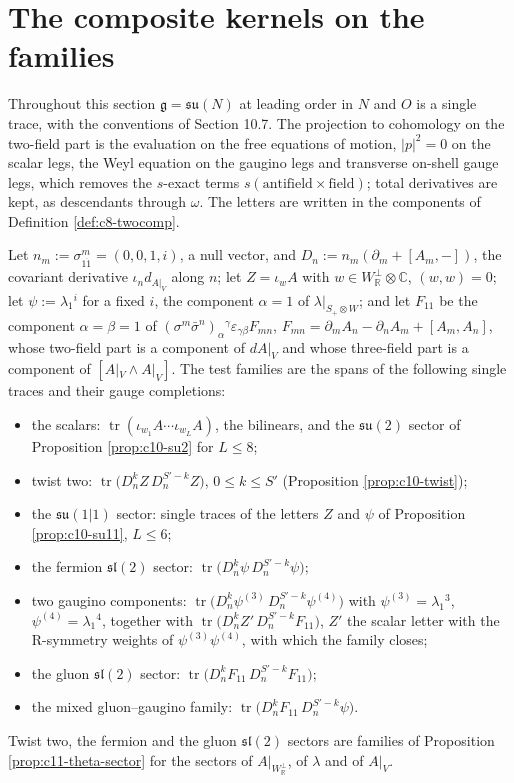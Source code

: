 \section{The composite kernels on the families}

Throughout this section $\mathfrak g=\mathfrak{su}(N)$ at leading order in $N$ and $O$ is a single trace, with the conventions of Section 10.7. The projection to cohomology on the two-field part is the evaluation on the free equations of motion, $|p|^2=0$ on the scalar legs, the Weyl equation on the gaugino legs and transverse on-shell gauge legs, which removes the $s$-exact terms $s(\text{antifield}\times\text{field})$; total derivatives are kept, as descendants through $\omega$. The letters are written in the components of Definition \ref{def:c8-twocomp}.

\begin{definition}
\label{def:c11-families}
Let $n_m:=\sigma^m_{1\dot1}=(0,0,1,i)$, a null vector, and $D_n:=n_m(\partial_m+[A_m,-])$, the covariant derivative $\iota_nd_{A|_V}$ along $n$; let $Z=\iota_wA$ with $w\in W_{\mathbb R}^\perp\otimes\mathbb C$, $(w,w)=0$; let $\psi:=\lambda_1{}^i$ for a fixed $i$, the component $\alpha=1$ of $\lambda|_{S_+\otimes W}$; and let $F_{11}$ be the component $\alpha=\beta=1$ of $(\sigma^m\bar\sigma^n)_\alpha{}^\gamma\varepsilon_{\gamma\beta}F_{mn}$, $F_{mn}=\partial_mA_n-\partial_nA_m+[A_m,A_n]$, whose two-field part is a component of $dA|_V$ and whose three-field part is a component of $[A|_V\wedge A|_V]$. The test families are the spans of the following single traces and their gauge completions:
\begin{itemize}
\item the scalars: $\operatorname{tr}(\iota_{w_1}A\cdots\iota_{w_L}A)$, the bilinears, and the $\mathfrak{su}(2)$ sector of Proposition \ref{prop:c10-su2} for $L\le8$;
\item twist two: $\operatorname{tr}\big(D_n^kZ\,D_n^{S'-k}Z\big)$, $0\le k\le S'$ (Proposition \ref{prop:c10-twist});
\item the $\mathfrak{su}(1|1)$ sector: single traces of the letters $Z$ and $\psi$ of Proposition \ref{prop:c10-su11}, $L\le6$;
\item the fermion $\mathfrak{sl}(2)$ sector: $\operatorname{tr}\big(D_n^k\psi\,D_n^{S'-k}\psi\big)$;
\item two gaugino components: $\operatorname{tr}\big(D_n^k\psi^{(3)}\,D_n^{S'-k}\psi^{(4)}\big)$ with $\psi^{(3)}=\lambda_1{}^3$, $\psi^{(4)}=\lambda_1{}^4$, together with $\operatorname{tr}\big(D_n^kZ'\,D_n^{S'-k}F_{11}\big)$, $Z'$ the scalar letter with the R-symmetry weights of $\psi^{(3)}\psi^{(4)}$, with which the family closes;
\item the gluon $\mathfrak{sl}(2)$ sector: $\operatorname{tr}\big(D_n^kF_{11}\,D_n^{S'-k}F_{11}\big)$;
\item the mixed gluon--gaugino family: $\operatorname{tr}\big(D_n^kF_{11}\,D_n^{S'-k}\psi\big)$.
\end{itemize}
Twist two, the fermion and the gluon $\mathfrak{sl}(2)$ sectors are families of Proposition \ref{prop:c11-theta-sector} for the sectors of $A|_{W_{\mathbb R}^\perp}$, of $\lambda$ and of $A|_V$.
\end{definition}

